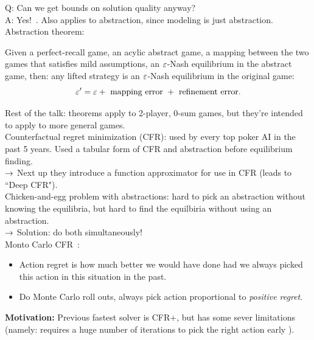 Q: Can we get bounds on solution quality anyway?  \\

A: Yes!~\cite{sandholm2012lossy}. Also applies to abstraction, since modeling is just abstraction. \\

Abstraction theorem:
\begin{theorem}
Given a perfect-recall game, an acylic abstract game, a mapping between the two games that satisfies mild assumptions, an $\varepsilon$-Nash equilibrium in the abstract game, then: any lifted strategy is an $\varepsilon$-Nash equilibrium in the original game:
\[
\varepsilon' = \varepsilon + \text{ mapping error } + \text{ refinement error.}
\]
\end{theorem}

Rest of the talk: theorems apply to 2-player, 0-sum games, but they're intended to apply to more general games. \\

Counterfactual regret minimization (CFR): used by every top poker AI in the past 5 years. Used a tabular form of CFR and abstraction before equilibrium finding. \\

$\rightarrow$ Next up they introduce a function approximator for use in CFR (leads to ``Deep CFR"). \\

Chicken-and-egg problem with abstractions: hard to pick an abstraction without knowing the equilibria, but hard to find the equilbiria without using an abstraction. \\

$\rightarrow$ Solution: do both simultaneously! \\

Monto Carlo CFR~\cite{lanctot2009monte}:
\begin{itemize}
    \item Action regret is how much better we would have done had we always picked this action in this situation in the past.
    \item Do Monte Carlo roll outs, always pick action proportional to {\it positive regret}.
\end{itemize}


{\bf Motivation:} Previous fastest solver is CFR+, but has some sever limitations (namely: requires a huge number of iterations to pick the right action early ). \\

